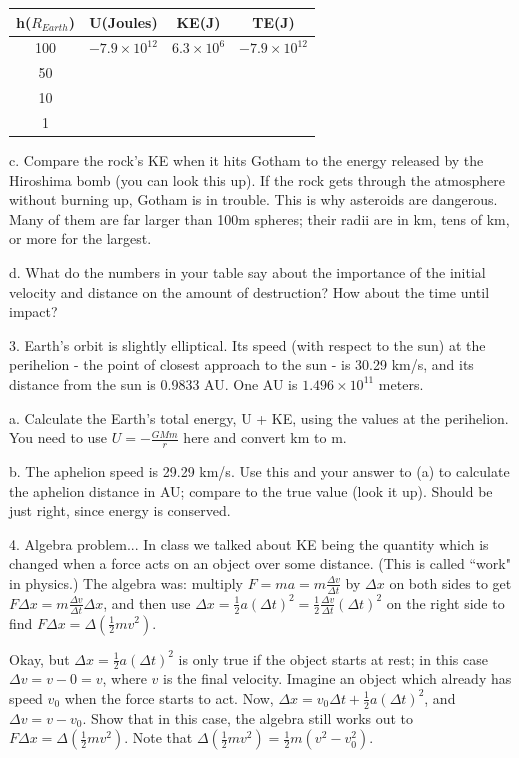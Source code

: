 \documentclass[12pt]{article}
\begin{document}
\begin{tabular}{c |c |c |c} %
h($R_{Earth}$) & U(Joules) & KE(J) & TE(J)\\ [0.5ex] %
\hline %
100 & $-7.9\times10^{12}$ & $6.3 \times 10^6$ & $-7.9\times10^{12}$ \\ %
50 &  &  &  \\
10 & & & \\
1 &  &  &  \\  [1ex] %
\hline %
\end{tabular}

c. Compare the rock's KE when it hits Gotham to the energy released by the Hiroshima bomb (you can look this up). If the rock gets through the atmosphere without burning up, Gotham is in trouble. This is why asteroids are dangerous. Many of them are far larger than 100m spheres; their radii are in km, tens of km, or more for the largest.

d. What do the numbers in your table say about the importance of the initial velocity and distance on the amount of destruction? How about the time until impact?


3. Earth's orbit is slightly elliptical. Its speed (with respect to the sun) at the perihelion - the point of closest approach to the sun - is 30.29 km/s, and its distance from the sun is 0.9833 AU. One AU is $1.496 \times 10^{11}$ meters. 

a. Calculate the Earth's total energy, U + KE, using the values at the perihelion. You need to use $U=-\frac{GMm}{r}$ here and convert km to m.

b. The aphelion speed is 29.29 km/s. Use this and your answer to (a) to calculate the aphelion distance in AU; compare to the true value (look it up). Should be just right, since energy is conserved.

4. Algebra problem... In class we talked about KE being the quantity which is changed when a force acts on an object over some distance. (This is called ``work" in physics.) The algebra was: multiply $F=ma=m\frac{\Delta v}{\Delta t}$ by $\Delta x$ on both sides to get $F \Delta x= m\frac{\Delta v}{\Delta t}\Delta x$, and then use $\Delta x = \frac{1}{2}a(\Delta t)^2=\frac{1}{2}\frac{\Delta v}{\Delta t}(\Delta t)^2$ on the right side to find $F \Delta x= \Delta(\frac{1}{2}mv^2)$.

Okay, but $\Delta x = \frac{1}{2}a(\Delta t)^2$ is only true if the object starts at rest; in this case $\Delta v = v-0=v$, where $v$ is the final velocity. Imagine an object which already has speed $v_0$ when the force starts to act. Now, $\Delta x = v_0\Delta t+\frac{1}{2}a(\Delta t)^2$, and $\Delta v = v-v_0$. Show that in this case, the algebra still works out to $F \Delta x= \Delta(\frac{1}{2}mv^2)$. Note that $\Delta(\frac{1}{2}mv^2) = \frac{1}{2}m(v^2-v_0^2)$.
\end{document}
